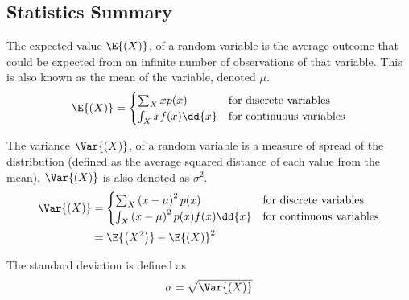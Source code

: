 \documentclass{article}
\begin{document}
\subsection{Statistics Summary}
\begin{definition}[Expectation]
    The expected value $\E{\left( X \right)}$, of a random variable is the average
    outcome that could be expected from an infinite number of observations of that
    variable. This is also known as the mean of the variable, denoted $\mu$.
    \begin{equation*}
        \E{\left( X \right)} =
        \begin{cases}
            \sum_{X} x p(x)        & \text{for discrete variables}   \\
            \int_{X} x f(x) \dd{x} & \text{for continuous variables}
        \end{cases}
    \end{equation*}
\end{definition}
\begin{definition}[Variance]
    The variance $\Var{\left( X \right)}$, of a random variable is a measure of spread
    of the distribution (defined as the average squared distance of each value from the mean).
    $\Var{\left( X \right)}$ is also denoted as $\sigma^2$.
    \begin{align*}
        \Var{\left( X \right)} & =
        \begin{cases}
            \sum_{X} \left( x - \mu \right)^2 p(x)             & \text{for discrete variables}   \\
            \int_{X} \left( x - \mu \right)^2 p(x) f(x) \dd{x} & \text{for continuous variables}
        \end{cases} \\
                               & = \E{\left( X^2 \right)} - \E{\left( X \right)}^2
    \end{align*}
\end{definition}
\begin{definition}
    The standard deviation is defined as
    \begin{equation*}
        \sigma = \sqrt{\Var{\left( X \right)}}
    \end{equation*}
\end{definition}
\end{document}
